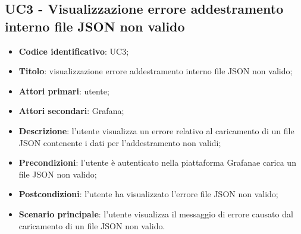 \subsection{UC3 - Visualizzazione errore addestramento interno file JSON non valido}
\begin{itemize}
	\item \textbf{Codice identificativo}: UC3;
	\item \textbf{Titolo}: visualizzazione errore addestramento interno file JSON non valido;
	\item \textbf{Attori primari}: utente;
	\item \textbf{Attori secondari}: Grafana\glo;
	\item \textbf{Descrizione}: l'utente visualizza un errore relativo al caricamento di un file JSON contenente i dati per l'addestramento non validi;
	\item \textbf{Precondizioni}: l'utente è autenticato nella piattaforma Grafana\glosp e carica un file JSON non valido;
	\item \textbf{Postcondizioni}: l'utente ha visualizzato l'errore file JSON non valido;	
	\item \textbf{Scenario principale}: l'utente visualizza il messaggio di errore causato dal caricamento di un file JSON non valido.	
\end{itemize}
